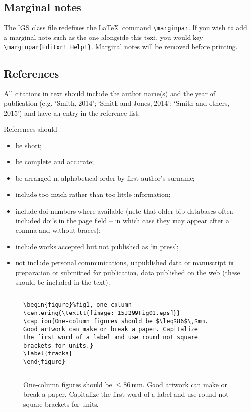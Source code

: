 \documentclass[review,oneside]{igs}
\begin{document}
\subsection{Marginal notes}

The IGS class file redefines the \LaTeX\ command \verb"\marginpar". If you wish to add a marginal note such as the one alongside this text, you would key \verb"\marginpar{Editor! Help!}". Marginal notes will be removed before printing.

\subsection{References}

All citations in text should include the author name(s) and the year of publication (e.g. `Smith, 2014'; `Smith and Jones, 2014'; `Smith and others, 2015') and have an entry in the reference list. 

References should:
\begin{itemize}
\item be short;
\item be complete and accurate;
\item be arranged in alphabetical order by first author's surname;
\item include too much rather than too little information;
\item include doi numbers where available (note that older bib databases often included doi's in the page field -- in which case they may appear after a comma and without braces);
\item include works accepted but not published as `in press';
\item not include personal communications, unpublished data or manuscript in preparation or submitted for publication, data published on the web (these should be included in the text).
\end{itemize}

\begin{figure}%
\caption{One-column figures should be $\leq$86$\,$mm.
Good artwork can make or break a paper. Capitalize
the first word of a label and use round not square 
brackets for units.}
\label{tracks}
\vspace\baselineskip\hrule %
\vspace\baselineskip
\begin{verbatim}
\begin{figure}%fig1, one column
\centering{\texttt{[image: 15J299Fig01.eps]}}
\caption{One-column figures should be $\leq$86$\,$mm.
Good artwork can make or break a paper. Capitalize
the first word of a label and use round not square 
brackets for units.}
\label{tracks}
\end{figure}
\end{verbatim}
\vspace\baselineskip\hrule %
\end{figure}
\end{document}
